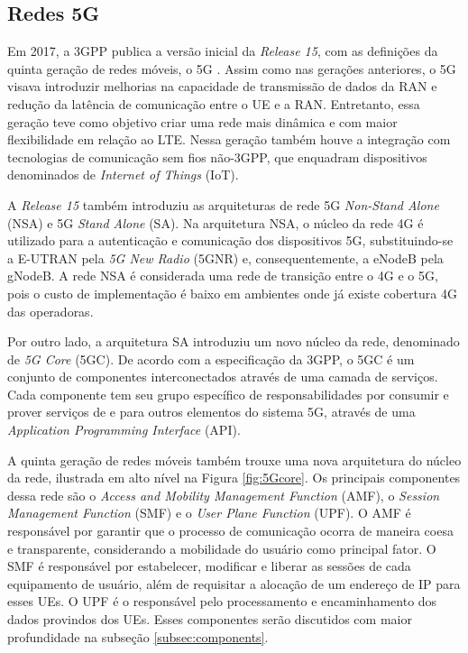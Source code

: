 \subsection{Redes 5G}

Em 2017, a 3GPP publica a versão inicial da \textit{Release 15}, com as definições da quinta geração de redes móveis, o 5G \cite{3gpp.21.205}.
Assim como nas gerações anteriores, o 5G visava introduzir melhorias na capacidade de transmissão de dados da RAN e redução da latência de comunicação entre o UE e a RAN.
Entretanto, essa geração teve como objetivo criar uma rede mais dinâmica e com maior flexibilidade em relação ao LTE.
Nessa geração também houve a integração com tecnologias de comunicação sem fios não-3GPP, que enquadram dispositivos denominados de \textit{Internet of Things} (IoT).

A \textit{Release 15} também introduziu as arquiteturas de rede 5G \textit{Non-Stand  Alone} (NSA) e 5G \textit{Stand Alone} (SA).
Na arquitetura NSA, o núcleo da rede 4G é utilizado para a autenticação e comunicação dos dispositivos 5G, substituindo-se a E-UTRAN pela \textit{5G New Radio} (5GNR) e, consequentemente, a eNodeB pela gNodeB.
A rede NSA é considerada uma rede de transição entre o 4G e o 5G, pois o custo de implementação é baixo em ambientes onde já existe cobertura 4G das operadoras.

Por outro lado, a arquitetura SA introduziu um novo núcleo da rede, denominado de \textit{5G Core} (5GC).
De acordo com a especificação da 3GPP, o 5GC é um conjunto de componentes interconectados através de uma camada de serviços. Cada componente tem seu grupo específico de responsabilidades por consumir e prover serviços de e para outros elementos do sistema 5G, através de uma \textit{Application Programming Interface} (API).

A quinta geração de redes móveis também trouxe uma nova arquitetura do núcleo da rede, ilustrada em alto nível na Figura \ref{fig:5Gcore}. Os principais componentes dessa rede são o \textit{Access and Mobility Management Function} (AMF), o \textit{Session Management Function} (SMF) e o \textit{User Plane Function} (UPF).
O AMF é responsável por garantir que o processo de comunicação ocorra de maneira coesa e transparente, considerando a mobilidade do usuário como principal fator.
O SMF é responsável por estabelecer, modificar e liberar as sessões de cada equipamento de usuário, além de requisitar a alocação de um endereço de IP para esses UEs.
O UPF é o responsável pelo processamento e encaminhamento dos dados provindos dos UEs. Esses componentes serão discutidos com maior profundidade na subseção \ref{subsec:components}.

